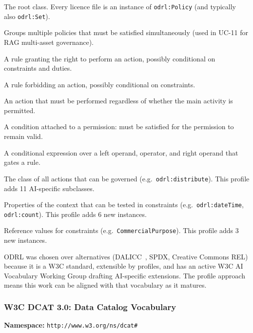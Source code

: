 \documentclass[12pt,a4paper]{article}
\begin{document}
\begin{description}[leftmargin=2cm, style=nextline]
  \item[\texttt{odrl:Policy}] The root class. Every licence file is an instance of \texttt{odrl:Policy} (and typically also \texttt{odrl:Set}).
  \item[\texttt{odrl:PolicySet}] Groups multiple policies that must be satisfied simultaneously (used in UC-11 for RAG multi-asset governance).
  \item[\texttt{odrl:permission}] A rule granting the right to perform an action, possibly conditional on constraints and duties.
  \item[\texttt{odrl:prohibition}] A rule forbidding an action, possibly conditional on constraints.
  \item[\texttt{odrl:obligation}] An action that must be performed regardless of whether the main activity is permitted.
  \item[\texttt{odrl:duty}] A condition attached to a permission: must be satisfied for the permission to remain valid.
  \item[\texttt{odrl:constraint}] A conditional expression over a left operand, operator, and right operand that gates a rule.
  \item[\texttt{odrl:Action}] The class of all actions that can be governed (e.g.\ \texttt{odrl:distribute}). This profile adds 11 AI-specific subclasses.
  \item[\texttt{odrl:LeftOperand}] Properties of the context that can be tested in constraints (e.g.\ \texttt{odrl:dateTime}, \texttt{odrl:count}). This profile adds 6 new instances.
  \item[\texttt{odrl:RightOperand}] Reference values for constraints (e.g.\ \texttt{CommercialPurpose}). This profile adds 3 new instances.
\end{description}

ODRL was chosen over alternatives (DALICC~\cite{dalicc}, SPDX, Creative Commons REL) because it is a W3C standard, extensible by profiles, and has an active W3C AI Vocabulary Working Group drafting AI-specific extensions. The profile approach means this work can be aligned with that vocabulary as it matures.

\subsubsection{W3C DCAT 3.0: Data Catalog Vocabulary}

\textbf{Namespace:} \texttt{http://www.w3.org/ns/dcat\#}
\end{document}
